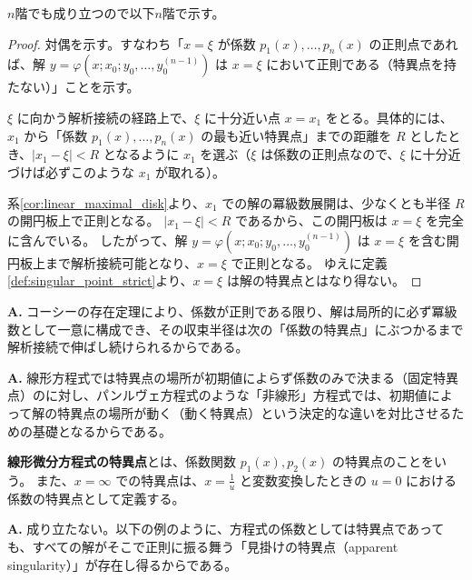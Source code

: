 $n$階でも成り立つので以下$n$階で示す。

\begin{proof}
    対偶を示す。すなわち「$x=\xi$ が係数 $p_{1}(x),\dots,p_{n}(x)$ の正則点であれば、解 $y=\varphi(x;x_{0};y_{0},\dots,y_{0}^{(n-1)})$ は $x=\xi$ において正則である（特異点を持たない）」ことを示す。

    $\xi$ に向かう解析接続の経路上で、$\xi$ に十分近い点 $x=x_{1}$ をとる。具体的には、$x_{1}$ から「係数 $p_1(x),\dots,p_n(x)$ の最も近い特異点」までの距離を $R$ としたとき、$|x_1 - \xi| < R$ となるように $x_1$ を選ぶ（$\xi$ は係数の正則点なので、$\xi$ に十分近づけば必ずこのような $x_1$ が取れる）。

    系\ref{cor:linear_maximal_disk}より、$x_1$ での解の冪級数展開は、少なくとも半径 $R$ の開円板上で正則となる。
    $|x_1 - \xi| < R$ であるから、この開円板は $x=\xi$ を完全に含んでいる。
    したがって、解 $y=\varphi(x;x_{0};y_{0},\dots,y_{0}^{(n-1)})$ は $x=\xi$ を含む開円板上まで解析接続可能となり、$x=\xi$ で正則となる。
    ゆえに定義\ref{def:singular_point_strict}より、$x=\xi$ は解の特異点とはなり得ない。
\end{proof}

\begin{Q}
\textbf{A.} コーシーの存在定理により、係数が正則である限り、解は局所的に必ず冪級数として一意に構成でき、その収束半径は次の「係数の特異点」にぶつかるまで解析接続で伸ばし続けられるからである。
\end{Q}

\begin{Q}
\textbf{A.} 線形方程式では特異点の場所が初期値によらず係数のみで決まる（固定特異点）のに対し、パンルヴェ方程式のような「非線形」方程式では、初期値によって解の特異点の場所が動く（動く特異点）という決定的な違いを対比させるための基礎となるからである。
\end{Q}
\begin{definition}[線形微分方程式の特異点]\label{def:linear_equation_singularity}
    \textbf{線形微分方程式の特異点}とは、係数関数 $p_{1}(x), p_{2}(x)$ の特異点のことをいう。
    また、$x=\infty$ での特異点は、$x=\frac{1}{u}$ と変数変換したときの $u=0$ における係数の特異点として定義する。
\end{definition}

\begin{Q}
\textbf{A.} 成り立たない。以下の例のように、方程式の係数としては特異点であっても、すべての解がそこで正則に振る舞う「見掛けの特異点（apparent singularity）」が存在し得るからである。
\end{Q}

